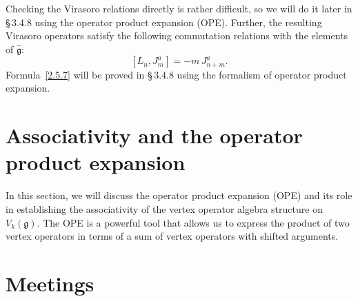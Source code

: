 \documentclass[12pt]{article}
\begin{document}
Checking the Virasoro relations directly is rather difficult, so we will
do it later in \S\,3.4.8 using the operator product expansion (OPE).
Further, the resulting Virasoro operators satisfy the following
commutation relations with the elements of $\widehat{\mathfrak{g}}$:
\begin{equation}\label{2.5.7}
[L_n, J^a_m] = -m\,J^a_{n+m}.
\end{equation}
Formula~\eqref{2.5.7} will be proved in \S\,3.4.8 using the formalism of operator product expansion.

\section{Associativity and the operator product expansion}

In this section, we will discuss the operator product expansion (OPE) and its role in establishing the associativity of the vertex operator algebra structure on $V_k(\mathfrak{g})$. The OPE is a powerful tool that allows us to express the product of two vertex operators in terms of a sum of vertex operators with shifted arguments.

 \section*{Meetings}
\end{document}

